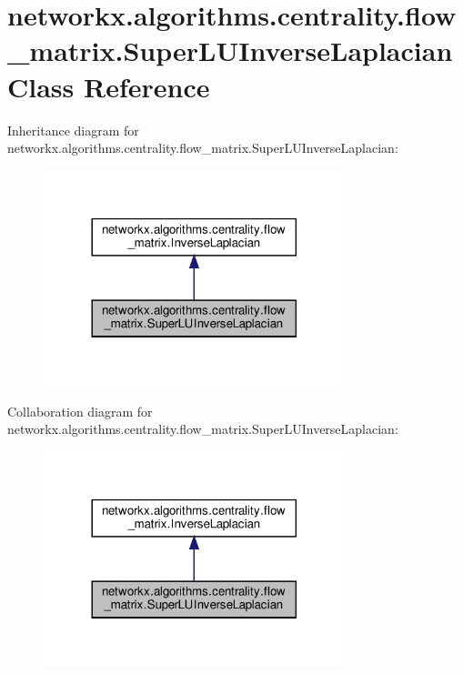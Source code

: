 \hypertarget{classnetworkx_1_1algorithms_1_1centrality_1_1flow__matrix_1_1SuperLUInverseLaplacian}{}\section{networkx.\+algorithms.\+centrality.\+flow\+\_\+matrix.\+Super\+L\+U\+Inverse\+Laplacian Class Reference}
\label{classnetworkx_1_1algorithms_1_1centrality_1_1flow__matrix_1_1SuperLUInverseLaplacian}


Inheritance diagram for networkx.\+algorithms.\+centrality.\+flow\+\_\+matrix.\+Super\+L\+U\+Inverse\+Laplacian\+:
\nopagebreak
\begin{figure}[H]
\begin{center}
\leavevmode
\includegraphics[width=248pt]{classnetworkx_1_1algorithms_1_1centrality_1_1flow__matrix_1_1SuperLUInverseLaplacian__inherit__graph}
\end{center}
\end{figure}


Collaboration diagram for networkx.\+algorithms.\+centrality.\+flow\+\_\+matrix.\+Super\+L\+U\+Inverse\+Laplacian\+:
\nopagebreak
\begin{figure}[H]
\begin{center}
\leavevmode
\includegraphics[width=248pt]{classnetworkx_1_1algorithms_1_1centrality_1_1flow__matrix_1_1SuperLUInverseLaplacian__coll__graph}
\end{center}
\end{figure}
